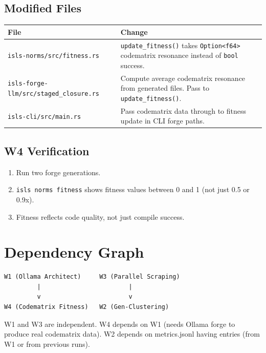 \documentclass[11pt,a4paper]{article}
\begin{document}
\subsection{Modified Files}

\begin{longtable}{lp{10cm}}
\toprule
\textbf{File} & \textbf{Change} \\
\midrule
\texttt{isls-norms/src/fitness.rs}
  & \texttt{update\_fitness()} takes \texttt{Option<f64>} 
    codematrix resonance instead of \texttt{bool} success. \\
\texttt{isls-forge-llm/src/staged\_closure.rs}
  & Compute average codematrix resonance from generated files. 
    Pass to \texttt{update\_fitness()}. \\
\texttt{isls-cli/src/main.rs}
  & Pass codematrix data through to fitness update in CLI 
    forge paths. \\
\bottomrule
\end{longtable}

\subsection{W4 Verification}

\begin{enumerate}[nosep]
\item Run two forge generations.
\item \texttt{isls norms fitness} shows fitness values between 
      0 and 1 (not just 0.5 or 0.9x).
\item Fitness reflects code quality, not just compile success.
\end{enumerate}


\section{Dependency Graph}

\begin{verbatim}
W1 (Ollama Architect)     W3 (Parallel Scraping)
         |                        |
         v                        v
W4 (Codematrix Fitness)   W2 (Gen-Clustering)
\end{verbatim}

W1 and W3 are independent. W4 depends on W1 (needs Ollama 
forge to produce real codematrix data). W2 depends on 
metrics.jsonl having entries (from W1 or from previous runs).
\end{document}
